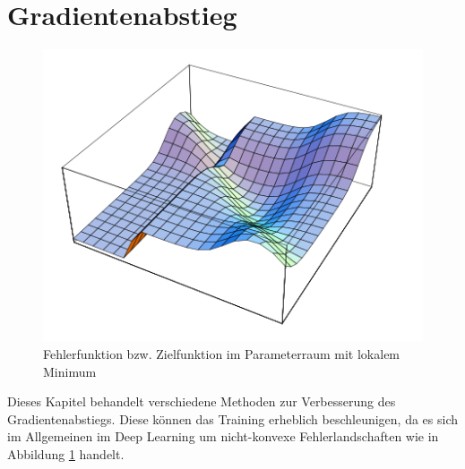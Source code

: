 

\section{Gradientenabstieg}
\label{ch:gradient}
\begin{figure}
\centering
\includegraphics[width=0.5\linewidth]{images/4_Gradient2}
\caption[]{Fehlerfunktion bzw. Zielfunktion im Parameterraum mit lokalem Minimum \cite[siehe][S. 155]{Rojas1996} }%
\label{fig:4_Gradient}
\end{figure}
Dieses Kapitel behandelt verschiedene Methoden zur Verbesserung des Gradientenabstiegs. Diese können das Training erheblich beschleunigen, da es sich im Allgemeinen im Deep Learning um nicht-konvexe Fehlerlandschaften wie in Abbildung \ref{fig:4_Gradient} handelt.

